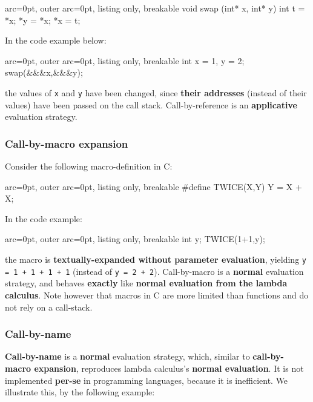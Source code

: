 \begin{tcblisting}{ arc=0pt, outer arc=0pt, listing only, breakable}
void swap (int* x, int* y){
       int t = *x;
       *y = *x;
       *x = t;
  }

\end{tcblisting}

In the code example below:

\begin{tcblisting}{ arc=0pt, outer arc=0pt, listing only, breakable}
int x = 1, y = 2;
swap(&\&&x,&\&&y);

\end{tcblisting}

the values of \texttt{x} and \texttt{y} have been changed, since \textbf{their addresses} (instead of their values) have been passed on the call stack. Call-by-reference is an \textbf{applicative} evaluation strategy.

\subsubsection*{ Call-by-macro expansion }

Consider the following macro-definition in C:

\begin{tcblisting}{ arc=0pt, outer arc=0pt, listing only, breakable}
#define TWICE(X,Y) {Y = X + X;}

\end{tcblisting}


In the code example:

\begin{tcblisting}{ arc=0pt, outer arc=0pt, listing only, breakable}
int y;
TWICE(1+1,y);

\end{tcblisting}


the macro is \textbf{textually-expanded without parameter evaluation}, yielding \texttt{y = 1 + 1 + 1 + 1} (instead of \texttt{y = 2 + 2}). Call-by-macro is a \textbf{normal} evaluation strategy, and behaves \textbf{exactly} like \textbf{normal evaluation from the lambda calculus}. Note however that macros in C are more limited than functions and do not rely on a call-stack.

\subsubsection*{ Call-by-name }

\textbf{Call-by-name} is a \textbf{normal} evaluation strategy, which, similar to \textbf{call-by-macro expansion}, reproduces lambda calculus's \textbf{normal evaluation}. It is not implemented \textbf{per-se} in programming languages, because it is inefficient. We illustrate this, by the following example:


